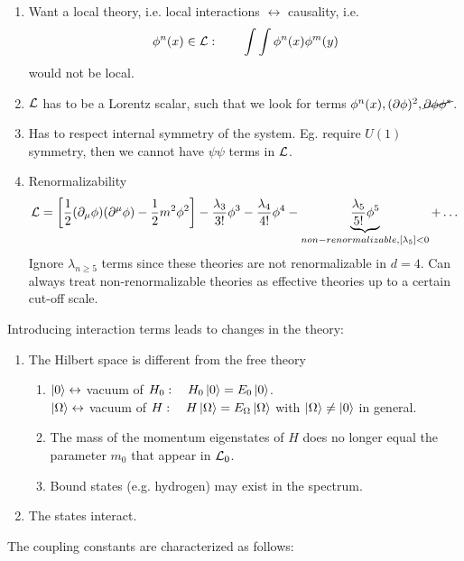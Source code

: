 \begin{enumerate}
	\item Want a local theory, i.e. local interactions $\leftrightarrow$ causality, i.e. \begin{equation}
	\phi^n(x) \in \mathcal{L}: \qquad \int \int \phi^n(x) \phi^m(y)
	\end{equation}
	would not be local.
	\item $\mathcal{L}$ has to be a Lorentz scalar, such that we look for terms $\phi^n(x), (\partial \phi)^2, \cancel{\partial \phi \phi^*}$.
	 \item Has to respect internal symmetry of the system. Eg. require $U(1)$ symmetry, then we cannot have $\psi \psi$ terms in $\mathcal{L}$.
	 \item Renormalizability
	 \begin{equation}
	 	\mathcal{L} = \left[\frac{1}{2} (\partial_\mu \phi) (\partial^\mu \phi) - \frac{1}{2} m^2 \phi^2\right] - \frac{\lambda_3}{3!} \phi^3-\frac{\lambda_4}{4!} \phi^4 - \underbrace{\frac{\lambda_5}{5!} \phi^5}_{non-renormalizable, [\lambda_5] <0} + \dots
	 \end{equation}
	 Ignore $\lambda_{n\geq5}$ terms since these theories are not renormalizable in $d=4$. Can always treat non-renormalizable theories as effective theories up to a certain cut-off scale.
\end{enumerate}
Introducing interaction terms leads to changes in the theory:\\
\begin{enumerate}
	\item The Hilbert space is different from the free theory
	\begin{enumerate}
		\item $\ket{0}\leftrightarrow$ vacuum of $H_0:\quad H_0\ket{0} =E_0 \ket{0}$.\\
		  $\ket{\Omega}\leftrightarrow$ vacuum of $H:\quad H\ket{\Omega}=E_{\Omega} \ket{\Omega}$
		with $\ket{\Omega}\neq \ket{0}$ in general.
		\item The mass of the momentum eigenstates of $H$ does no longer equal the parameter $m_0$ that appear in $\mathcal{L}_0$.
		\item Bound states (e.g. hydrogen) may exist in the spectrum.
		\end{enumerate}
\item The states interact.
\end{enumerate}
The coupling constants are characterized as follows:
